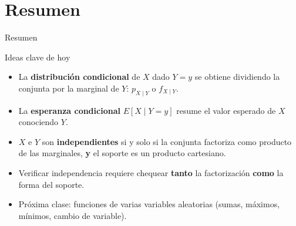 \documentclass[aspectratio=169,11pt]{beamer}
\begin{document}
\section{Resumen}

\begin{frame}{Resumen}
\begin{block}{Ideas clave de hoy}
\begin{itemize}
\item La \textbf{distribución condicional} de $X$ dado $Y=y$ se obtiene dividiendo la conjunta por la marginal de $Y$: $p_{X\mid Y}$ o $f_{X\mid Y}$.
\item La \textbf{esperanza condicional} $E[X\mid Y=y]$ resume el valor esperado de $X$ conociendo $Y$.
\item $X$ e $Y$ son \textbf{independientes} si y solo si la conjunta factoriza como producto de las marginales, \textbf{y} el soporte es un producto cartesiano.
\item Verificar independencia requiere chequear \textbf{tanto} la factorización \textbf{como} la forma del soporte.
\item Próxima clase: funciones de varias variables aleatorias (sumas, máximos, mínimos, cambio de variable).
\end{itemize}
\end{block}
\end{frame}
\end{document}
